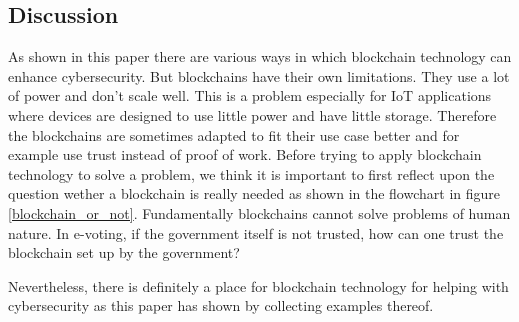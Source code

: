 \subsection{Discussion}

As shown in this paper there are various ways in which blockchain technology can enhance cybersecurity.
But blockchains have their own limitations. They use a lot of power and don't scale well. This is a problem especially for IoT applications
where devices are designed to use little power and have little storage. Therefore the blockchains are sometimes adapted to fit their use case better and for example use trust instead of proof of work.
Before trying to apply blockchain technology to solve a problem, we think it is important to first reflect upon the question wether a blockchain is really needed as shown in the flowchart in figure \ref{blockchain_or_not}.
Fundamentally blockchains cannot solve problems of human nature. In e-voting, if the government itself is not trusted, how can one trust the blockchain set up by the government?

Nevertheless, there is definitely a place for blockchain technology for helping with cybersecurity as this paper has shown by collecting examples thereof.








